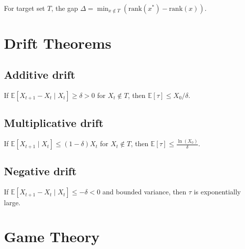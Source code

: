 \begin{definition}
  \label{def:ranking_gap}
  For target set $T$, the gap $\Delta = \min_{x \notin T} (\text{rank}(x^*) - \text{rank}(x))$.
\end{definition}

\chapter{Drift Theorems}

\section{Additive drift}
\begin{theorem}
  \label{thm:additive_drift}
  If $\mathbb{E}[X_{t+1} - X_t \mid X_t] \geq \delta > 0$ for $X_t \notin T$, then $\mathbb{E}[\tau] \leq X_0 / \delta$.
  \leanok
\end{theorem}

\section{Multiplicative drift}
\begin{theorem}
  \label{thm:multiplicative_drift}
  If $\mathbb{E}[X_{t+1} \mid X_t] \leq (1 - \delta) X_t$ for $X_t \notin T$, then $\mathbb{E}[\tau] \leq \frac{\ln(X_0)}{\delta}$.
  \leanok
\end{theorem}

\section{Negative drift}
\begin{theorem}
  \label{thm:negative_drift}
  If $\mathbb{E}[X_{t+1} - X_t \mid X_t] \leq -\delta < 0$ and bounded variance, then $\tau$ is exponentially large.
  \leanok
\end{theorem}

\chapter{Game Theory}

